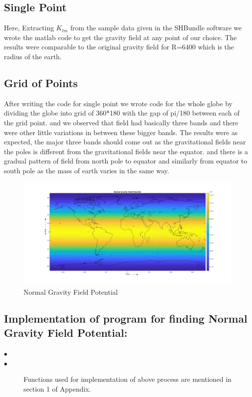 \documentclass[a4paper,12pt]{report}
\begin{document}
\subsection{Single Point}
Here, Extracting $K_{lm}$ from the sample data given in the SHBundle software we wrote the matlab code to get the gravity field at any point of our choice.
The results were comparable to the original gravity field for R=6400 which is the radius of the earth.
\subsection{ Grid of Points}

After writing the code for single point we wrote code for the whole globe by dividing the globe into grid of 360*180 with the gap of pi/180 between each of the grid point.
and we observed that field had basically three bands and there were other little variations in between these bigger bands. The results were as expected, the major three bands should come out as the gravitational fields near the poles is different from the gravitational fields near the equator. and there is a gradual pattern of field from north pole to equator and similarly from equator to south pole as the mass of earth varies in the same way.

\begin{figure}[!h]
    \centering
    \includegraphics[width=0.96\linewidth]{Normal_grid}
    \caption{Normal Gravity Field Potential}
    
\end{figure}

\subsection{Implementation of program for finding Normal Gravity Field Potential:}
\begin{description}
\item[$\bullet$]
\item[$\bullet$]Functions used for implementation of above process are mentioned in section 1 of Appendix.
\end{description}   
\end{document}
